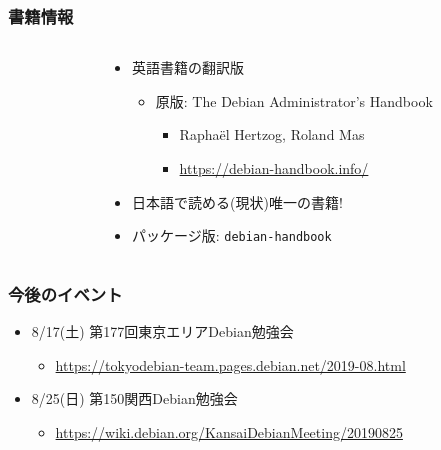 \documentclass[cjk,c,squeeze,shrink,dvipdfmx,12pt]{beamer}
\begin{document}
\begin{frame}
  \frametitle{書籍情報}
  \begin{columns}
    \begin{column}{.45\paperwidth}
      \centering
    \end{column}
    \begin{column}{.54\paperwidth}
      \begin{itemize}
      \item %
        英語書籍の翻訳版
        \begin{itemize}
        \item %
          原版: The Debian Administrator's Handbook
          \begin{itemize}
          \item %
            Rapha\"el Hertzog, Roland Mas
          \item \url{https://debian-handbook.info/}
          \end{itemize}
        \end{itemize}
      \item %
        日本語で読める(現状)唯一の書籍!
      \item %
        パッケージ版:
        \texttt{debian-handbook}
      \end{itemize}
    \end{column}
  \end{columns}
\end{frame}


\begin{frame}
  \frametitle{今後のイベント}
  \begin{itemize}
  \item 8/17(土) 第177回東京エリアDebian勉強会
    \begin{itemize}
    \item \url{https://tokyodebian-team.pages.debian.net/2019-08.html}
    \end{itemize}
  \item 8/25(日) 第150関西Debian勉強会
    \begin{itemize}
    \item \url{https://wiki.debian.org/KansaiDebianMeeting/20190825}
    \end{itemize}
  \end{itemize}
\end{frame}

\end{document}
